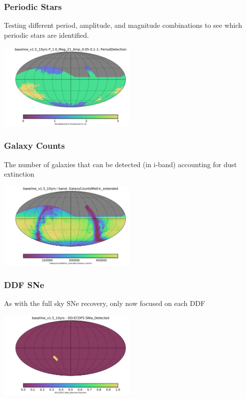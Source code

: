 {\subsubsection{Periodic Stars}

Testing different period, amplitude, and magnitude combinations to see which periodic stars are identified.

\includegraphics[width=0.5\textwidth]{metric_summary/sci_baseline_v1.5_10yrs/baseline_v1_5_10yrs_PeriodDetection_P_1_0_Mag_21_Amp_0_05-0_1-1_HEAL_SkyMap.pdf}

\subsubsection{Galaxy Counts}

The number of galaxies that can be detected (in i-band) accounting for dust extinction

\includegraphics[width=0.5\textwidth]{metric_summary/sci_baseline_v1.5_10yrs/baseline_v1_5_10yrs_GalaxyCountsMetric_extended_i_band_HEAL_SkyMap.pdf}

\subsubsection{DDF SNe}

As with the full sky SNe recovery, only now focused on each DDF

\includegraphics[width=0.5\textwidth]{metric_summary/sci_baseline_v1.5_10yrs/baseline_v1_5_10yrs_DD_ECDFS_SNIa_Detected_USER_SkyMap.pdf}

}
